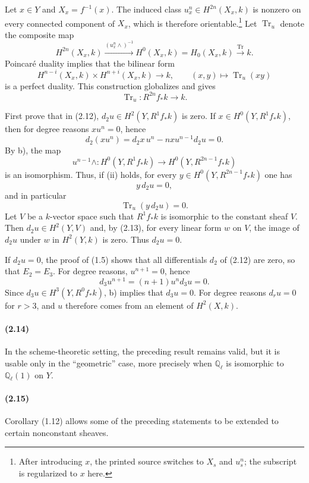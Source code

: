 \documentclass[10pt]{article}
\providecommand{\Ql}{\mathbb Q_\ell}
\providecommand{\Tr}{\operatorname{Tr}}
\begin{document}
Let $x\in Y$ and $X_x=f^{-1}(x)$. The induced class $u_x^n\in H^{2n}(X_x,k)$ is nonzero on every connected component of $X_x$, which is therefore orientable.\footnote{After introducing $x$, the printed source switches to $X_s$ and $u_s^n$; the subscript is regularized to $x$ here.} Let $\Tr_u$ denote the composite map
\[
H^{2n}(X_x,k)\xrightarrow{(u_x^n\wedge)^{-1}}H^0(X_x,k)=H_0(X_x,k)\xrightarrow{\Tr}k.
\]
Poincaré duality implies that the bilinear form
\[
H^{n-i}(X_x,k)\times H^{n+i}(X_x,k)\longrightarrow k,
\qquad (x,y)\longmapsto \Tr_u(xy)
\]
is a perfect duality. This construction globalizes and gives
\[
\Tr_u:R^{2n}f_*k\longrightarrow k.
\]

First prove that in (2.12), $d_2u\in H^2(Y,R^1f_*k)$ is zero. If $x\in H^0(Y,R^1f_*k)$, then for degree reasons $xu^n=0$, hence
\[
d_2(xu^n)=d_2x\,u^n-nxu^{n-1}d_2u=0.
\]
By b), the map
\[
 u^{n-1}\wedge:H^0(Y,R^1f_*k)\longrightarrow H^0(Y,R^{2n-1}f_*k)
\]
is an isomorphism. Thus, if (ii) holds, for every $y\in H^0(Y,R^{2n-1}f_*k)$ one has
\[
y\,d_2u=0,
\]
and in particular
\[
\tag{2.13}
\Tr_u(y\,d_2u)=0.
\]
Let $V$ be a $k$-vector space such that $R^1f_*k$ is isomorphic to the constant sheaf $V$. Then $d_2u\in H^2(Y,V)$ and, by (2.13), for every linear form $w$ on $V$, the image of $d_2u$ under $w$ in $H^2(Y,k)$ is zero. Thus $d_2u=0$.

If $d_2u=0$, the proof of (1.5) shows that all differentials $d_2$ of (2.12) are zero, so that $E_2=E_3$. For degree reasons, $u^{n+1}=0$, hence
\[
d_3u^{n+1}=(n+1)u^n d_3u=0.
\]
Since $d_3u\in H^3(Y,R^0f_*k)$, b) implies that $d_3u=0$. For degree reasons $d_ru=0$ for $r>3$, and $u$ therefore comes from an element of $H^2(X,k)$.

\paragraph{(2.14)} In the scheme-theoretic setting, the preceding result remains valid, but it is usable only in the ``geometric'' case, more precisely when $\Ql$ is isomorphic to $\Ql(1)$ on $Y$.

\paragraph{(2.15)} Corollary (1.12) allows some of the preceding statements to be extended to certain nonconstant sheaves.
\end{document}
